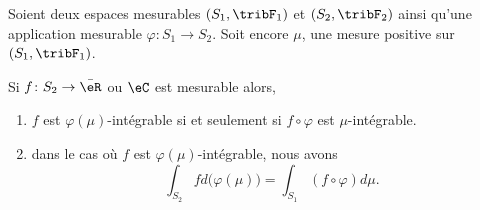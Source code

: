 \begin{theorem}      \label{THOooVADUooLiRfGK}
	Soient deux espaces mesurables \( (S_1,\tribF_1)\) et \( (S_2,\tribF_2)\) ainsi qu'une application mesurable \( \varphi\colon S_1\to S_2\). Soit encore \( \mu\), une mesure positive sur \( (S_1,\tribF_1)\).

	Si \( f\colon S_2\to\bar \eR\) ou \( \eC\) est mesurable alors,
	\begin{enumerate}
		\item      \label{ItemooKMBIooZpHJSS}
		      \( f\) est \( \varphi(\mu)\)-intégrable si et seulement si \( f\circ\varphi\) est \( \mu\)-intégrable.
		\item       \label{ItemooLAPYooUreDEl}
		      dans le cas où \( f\) est \( \varphi(\mu)\)-intégrable, nous avons
		      \begin{equation}        \label{EqooSOHXooXSbdoy}
			      \int_{S_2}fd\big( \varphi(\mu) \big)=\int_{S_1}(f\circ\varphi)d\mu.
		      \end{equation}
	\end{enumerate}
\end{theorem}

